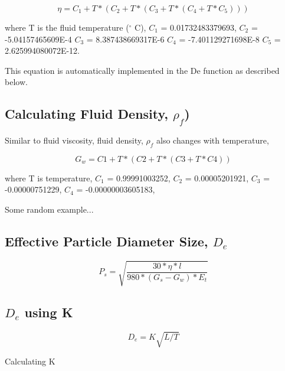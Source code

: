 \documentclass{tufte-handout}
\begin{document}
\begin{equation}
\eta = C_1 + T * (C_2 + T * (C_3 + T *  (C_4 + T * C_5)))
\end{equation}

where T is the fluid temperature ($^\circ$ C),
$C_1$ = 0.01732483379693,
$C_2$ = -5.04157465609E-4
$C_3$ = 8.387438669317E-6
$C_4$ = -7.401129271698E-8
$C_5$ = 2.625994080072E-12.

This equation is automatically implemented in the De function as described below. 

\subsection{Calculating Fluid Density, $\rho_f$)}

Similar to fluid viscosity, fluid density, $\rho_f$ also changes with temperature,

\begin{equation}
G_w = C1 + T * (C2 + T * (C3 + T * C4))
\end{equation}

where T is temperature, 
$C_1$ = 0.99991003252,
$C_2$ = 0.00005201921, 
$C_3$ = -0.00000751229, 
$C_4$ = -0.00000003605183,




Some random example...


\subsection{Effective Particle Diameter Size, $D_e$}

\begin{equation}
P_s = \sqrt{\frac{30*\eta*l}{980*(G_s - G_w)*E_t}}
\end{equation}

\newpage
\subsection{$D_e$ using K}

\begin{equation}
D_e = K \sqrt{L/T}
\end{equation}


Calculating K

\begin{Schunk}
\begin{Sinput}
 
\end{Sinput}
\end{Schunk}
\end{document}
